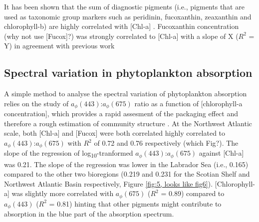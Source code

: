 \documentclass[utf8]{frontiersSCNS} %
\begin{document}
It has been shown that the sum of diagnostic pigments (i.e., pigments that are used as taxonomic group markers such as peridinin, fucoxanthin, zeaxanthin and chlorophyll-b) are highly correlated with [Chl-a] \citep{claustre1994,vidussi2001,uitz2006,}. Fucoxanthin concentration (why not use [Fucox]?) was strongly correlated to [Chl-a] with a slope of X ($R^2$ = Y) in agreement with previous work \citep{claustre1994} 


\subsection{Spectral variation in phytoplankton absorption}

A simple method to analyse the spectral variation of phytoplankton absorption relies on the study of $a_\phi(443)$:$a_\phi(675)$ ratio as a function of [chlorophyll-a concentration], which provides a rapid assesment of the packaging effect and therefore a rough estimation of community structure \citep{Bricaud2005, devred2006,Vishnu2018}. At the Northwest Atlantic scale, both [Chl-a] and [Fucox] were both correlated highly correlated to $a_\phi(443)$:$a_\phi(675)$ with $R^2$ of 0.72 and 0.76 respectively (which Fig?). The slope of the regression of log\textsubscript{10}-tranformed $a_\phi(443)$:$a_\phi(675)$ against [Chl-a] was 0.21.
The slope of the regression was lower in the Labrador Sea (i.e., 0.165) compared to the other two bioregions (0.219 and 0.231 for the Scotian Shelf and Northwest Atlantic Basin respectively, Figure \ref{fig:5, looks like fig6}). [Chlorophyll-a] was slightly more correlated with $a_\phi(675)$ ($R^2$ = 0.89) compared to $a_\phi(443)$ ($R^2$ = 0.81) hinting that other pigments might contribute to absorption in the blue part of the absorption spectrum.
\end{document}
